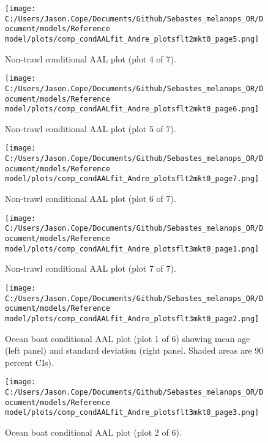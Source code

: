 \documentclass[11pt,
  english,
  letterpaper,
]{article}
\begin{document}
\begin{figure}
\centering
\texttt{[image: C:/Users/Jason.Cope/Documents/Github/Sebastes\_melanops\_OR/Document/models/Reference model/plots/comp\_condAALfit\_Andre\_plotsflt2mkt0\_page5.png]}
\caption{Non-trawl conditional AAL plot (plot 4 of 7).\label{fig:comp_condAALfit_Andre_plotsflt2mkt0_page5}}
\end{figure}

\begin{figure}
\centering
\texttt{[image: C:/Users/Jason.Cope/Documents/Github/Sebastes\_melanops\_OR/Document/models/Reference model/plots/comp\_condAALfit\_Andre\_plotsflt2mkt0\_page6.png]}
\caption{Non-trawl conditional AAL plot (plot 5 of 7).\label{fig:comp_condAALfit_Andre_plotsflt2mkt0_page6}}
\end{figure}

\begin{figure}
\centering
\texttt{[image: C:/Users/Jason.Cope/Documents/Github/Sebastes\_melanops\_OR/Document/models/Reference model/plots/comp\_condAALfit\_Andre\_plotsflt2mkt0\_page7.png]}
\caption{Non-trawl conditional AAL plot (plot 6 of 7).\label{fig:comp_condAALfit_Andre_plotsflt2mkt0_page7}}
\end{figure}

\begin{figure}
\centering
\texttt{[image: C:/Users/Jason.Cope/Documents/Github/Sebastes\_melanops\_OR/Document/models/Reference model/plots/comp\_condAALfit\_Andre\_plotsflt3mkt0\_page1.png]}
\caption{Non-trawl conditional AAL plot (plot 7 of 7).\label{fig:comp_condAALfit_Andre_plotsflt3mkt0_page1}}
\end{figure}

\begin{figure}
\centering
\texttt{[image: C:/Users/Jason.Cope/Documents/Github/Sebastes\_melanops\_OR/Document/models/Reference model/plots/comp\_condAALfit\_Andre\_plotsflt3mkt0\_page2.png]}
\caption{Ocean boat conditional AAL plot (plot 1 of 6) showing mean age (left panel) and standard deviation (right panel. Shaded areas are 90 percent CIs).\label{fig:comp_condAALfit_Andre_plotsflt3mkt0_page2}}
\end{figure}

\begin{figure}
\centering
\texttt{[image: C:/Users/Jason.Cope/Documents/Github/Sebastes\_melanops\_OR/Document/models/Reference model/plots/comp\_condAALfit\_Andre\_plotsflt3mkt0\_page3.png]}
\caption{Ocean boat conditional AAL plot (plot 2 of 6).\label{fig:comp_condAALfit_Andre_plotsflt3mkt0_page3}}
\end{figure}
\end{document}
